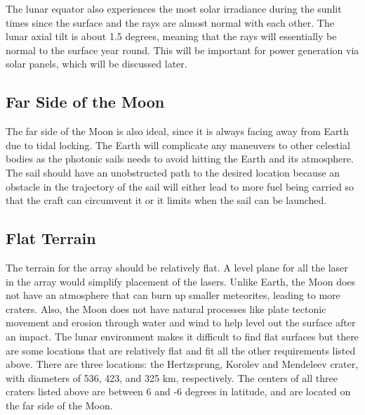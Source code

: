 \documentclass{aa}
\begin{document}
The lunar equator also experiences the most solar irradiance during the sunlit times since the surface and the rays are almost normal with each other. The lunar axial tilt is about 1.5 degrees, meaning that the rays will essentially be normal to the surface year round. This will be important for power generation via solar panels, which will be discussed later.
\subsection{Far Side of the Moon}
The far side of the Moon is also ideal, since it is always facing away from Earth due to tidal locking. The Earth will complicate any maneuvers to other celestial bodies as the photonic sails needs to avoid hitting the Earth and its atmosphere. The sail should have an unobstructed path to the desired location because an obstacle in the trajectory of the sail will either lead to more fuel being carried so that the craft can circumvent it or it limits when the sail can be launched.
\subsection{Flat Terrain}
The terrain for the array should be relatively flat. A level plane for all the laser in the array would simplify placement of the lasers. Unlike Earth, the Moon does not have an atmosphere that can burn up smaller meteorites, leading to more craters. Also, the Moon does not have natural processes like plate tectonic movement and erosion through water and wind to help level out the surface after an impact. The lunar environment makes it difficult to find flat surfaces but there are some locations that are relatively flat and fit all the other requirements listed above. There are three locations: the Hertzsprung, Korolev and Mendeleev crater, with diameters of 536, 423, and 325 km, respectively. The centers of all three craters listed above are between 6 and -6 degrees in latitude, and are located on the far side of the Moon. 
\end{document}
